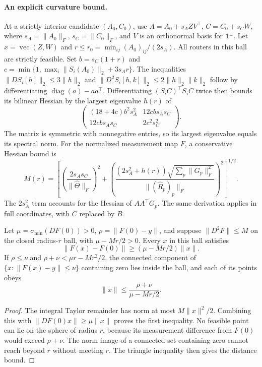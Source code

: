 \paragraph{An explicit curvature bound.}
At a strictly interior candidate $(A_0,C_0)$, use
$A=A_0+s_A ZV^\top$, $C=C_0+s_C W$, where
$s_A=\|A_0\|_F$, $s_C=\|C_0\|_F$, and $V$ is an orthonormal basis for
$\mathbf1^\perp$. Let $x=\operatorname{vec}(Z,W)$ and
$r\le r_0=\min_{ij}(A_0)_{ij}/(2s_A)$.
All routers in this ball are strictly feasible.
Set $b=s_C(1+r)$ and
$c=\min\{1,\max_i\|S_i(A_0)\|_2+3s_A r\}$.
The inequalities
$\|DS_i[h]\|_2\le3\|h\|_2$ and
$\|D^2S_i[h,k]\|_2\le2\|h\|_2\|k\|_2$
follow by differentiating $\operatorname{diag}(a)-aa^\top$.
Differentiating $(S_iC)^\top S_iC$ twice then bounds its bilinear Hessian
by the largest eigenvalue $h(r)$ of
\[
 \begin{pmatrix}
 (18+4c)b^2s_A^2 & 12cb s_As_C\\
 12cb s_As_C & 2c^2s_C^2
 \end{pmatrix}.
\]
The matrix is symmetric with nonnegative entries, so its largest eigenvalue
equals its spectral norm. For the normalized measurement map $F$, a
conservative Hessian bound is
\[
 M(r)=\left[
 \left(\frac{2s_As_C}{\|\widehat\Theta\|_F}\right)^2+
 \left(\frac{(2s_A^2+h(r))\sqrt{\sum_p\|G_p\|_F^2}}
 {\|(\widehat R_p)_p\|_F}\right)^2
 \right]^{1/2}.
\]
The $2s_A^2$ term accounts for the Hessian of $AA^\top G_p$.
The same derivation applies in full coordinates, with $C$ replaced by $B$.

\begin{proposition}
\label{prop:trusted-local}
Let $\mu=\sigma_{\min}(DF(0))>0$, $\rho=\|F(0)-y\|$, and suppose
$\|D^2F\|\le M$ on the closed radius-$r$ ball, with $\mu-Mr/2>0$.
Every $x$ in this ball satisfies
\[
 \|F(x)-F(0)\|\ge(\mu-Mr/2)\|x\|.
\]
If $\rho\le\nu$ and $\rho+\nu<\mu r-Mr^2/2$, the connected component of
$\{x:\|F(x)-y\|\le\nu\}$ containing zero lies inside the ball, and each of
its points obeys
\[
 \|x\|\le\frac{\rho+\nu}{\mu-Mr/2}.
\]
\end{proposition}
\begin{proof}
The integral Taylor remainder has norm at most $M\|x\|^2/2$.
Combining this with $\|DF(0)x\|\ge\mu\|x\|$ proves the first inequality.
No feasible point can lie on the sphere of radius $r$, because its
measurement difference from $F(0)$ would exceed $\rho+\nu$.
The norm image of a connected set containing zero cannot reach beyond $r$
without meeting $r$. The triangle inequality then gives the distance bound.
\end{proof}

